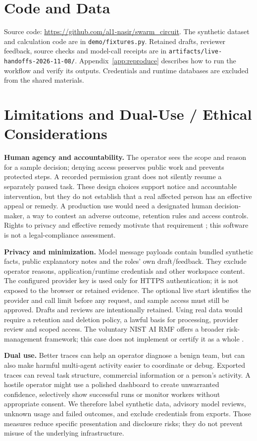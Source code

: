 \documentclass[11pt,letterpaper]{article}
\begin{document}
\section*{Code and Data}
Source code: \url{https://github.com/al1-nasir/swarm_circuit}. The synthetic dataset and calculation code are in \texttt{demo/fixtures.py}. Retained drafts, reviewer feedback, source checks and model-call receipts are in \texttt{artifacts/live-handoffs-2026-11-08/}. Appendix~\ref{app:reproduce} describes how to run the workflow and verify its outputs. Credentials and runtime databases are excluded from the shared materials.

\clearpage



\clearpage
\appendix
\section{Limitations and Dual-Use / Ethical Considerations}
\label{app:ethics}
\textbf{Human agency and accountability.} The operator sees the scope and reason for a sample decision; denying access preserves public work and prevents protected steps. A recorded permission grant does not silently resume a separately paused task. These design choices support notice and accountable intervention, but they do not establish that a real affected person has an effective appeal or remedy. A production use would need a designated human decision-maker, a way to contest an adverse outcome, retention rules and access controls. Rights to privacy and effective remedy motivate that requirement \citep{udhr1948}; this software is not a legal-compliance assessment.

\textbf{Privacy and minimization.} Model message payloads contain bundled synthetic facts, public explanatory notes and the roles' own draft/feedback. They exclude operator reasons, application/runtime credentials and other workspace content. The configured provider key is used only for HTTPS authentication; it is not exposed to the browser or retained evidence. The optional live start identifies the provider and call limit before any request, and sample access must still be approved. Drafts and reviews are intentionally retained. Using real data would require a retention and deletion policy, a lawful basis for processing, provider review and scoped access. The voluntary NIST AI RMF offers a broader risk-management framework; this case does not implement or certify it as a whole \citep{nist2023}.

\textbf{Dual use.} Better traces can help an operator diagnose a benign team, but can also make harmful multi-agent activity easier to coordinate or debug. Exported traces can reveal task structure, commercial information or a person's activity. A hostile operator might use a polished dashboard to create unwarranted confidence, selectively show successful runs or monitor workers without appropriate consent. We therefore label synthetic data, advisory model reviews, unknown usage and failed outcomes, and exclude credentials from exports. Those measures reduce specific presentation and disclosure risks; they do not prevent misuse of the underlying infrastructure.
\end{document}
